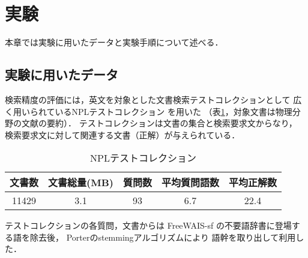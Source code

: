 \section{実験}
\label{sec:experiment}
本章では実験に用いたデータと実験手順について述べる．
\subsection{実験に用いたデータ}
検索精度の評価には，英文を対象とした文書検索テストコレクションとして
広く用いられているNPLテストコレクション
\cite{bib:NPL,bib:Glasgow}を用いた
（表\ref{table:collections}，対象文書は物理分野の文献の要約）．
テストコレクションは文書の集合と検索要求文からなり，
検索要求文に対して関連する文書（正解）が与えられている．
\begin{table}[tbp]
\begin{center}
\caption{NPLテストコレクション}
\begin{tabular}{c|c|c|c|c} \hline
文書数 & 文書総量(MB) & 質問数 & 平均質問語数 & 平均正解数 \\ \hline
11429 & 3.1 & 93 & 6.7 & 22.4 \\ \hline
\end{tabular}
\label{table:collections}
\end{center}
\end{table}
テストコレクションの各質問，文書からは
FreeWAIS-sf
\cite{bib:free_wais}の不要語辞書に登場する語を除去後，
Porterのstemmingアルゴリズム\cite{bib:Porter}により
語幹を取り出して利用した．

